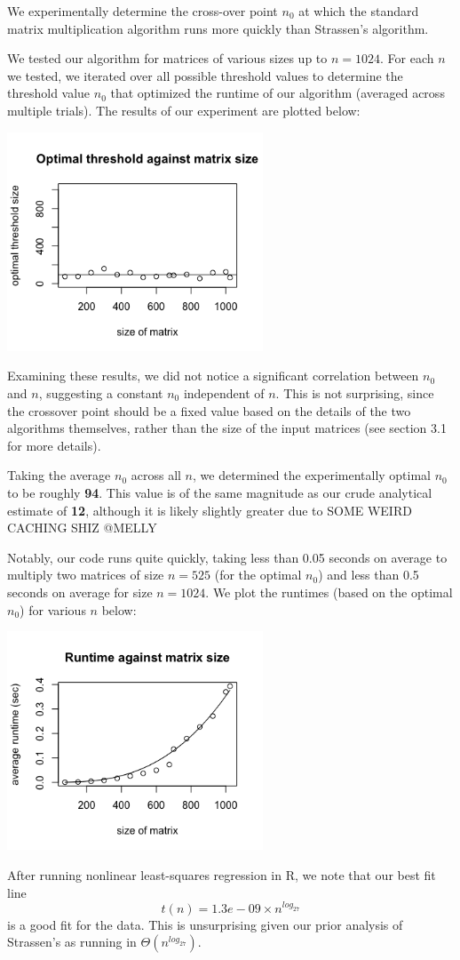 \documentclass[a4paper]{article}
\begin{document}
We experimentally determine the cross-over point $n_0$ at which the standard matrix multiplication algorithm runs more quickly than Strassen's algorithm.

We tested our algorithm for matrices of various sizes up to $n=1024$. For each $n$ we tested, we iterated over all possible threshold values to determine the threshold value $n_0$ that optimized the runtime of our algorithm (averaged across multiple trials). The results of our experiment are plotted below: \\

\begin{centering}
\includegraphics[width=3in]{threshplot} \\
\end{centering}

Examining these results, we did not notice a significant correlation between $n_0$ and $n$, suggesting a constant $n_0$ independent of $n$. This is not surprising, since the crossover point should be a fixed value based on the details of the two algorithms themselves, rather than the size of the input matrices (see section 3.1 for more details).

Taking the average $n_0$ across all $n$, we determined the experimentally optimal $n_0$ to be roughly \textbf{94}. This value is of the same magnitude as our crude analytical estimate of \textbf{12}, although it is likely slightly greater due to SOME WEIRD CACHING SHIZ @MELLY

Notably, our code runs quite quickly, taking less than 0.05 seconds on average to multiply two matrices of size $n = 525$ (for the optimal $n_0$) and less than 0.5 seconds on average for size $n = 1024$. We plot the runtimes (based on the optimal $n_0$) for various $n$ below: \\

\begin{centering}
\includegraphics[width=3in]{timeplot} \\
\end{centering}

After running nonlinear least-squares regression in R, we note that our best fit line $$t(n) = 1.3e-09 \times n^{log_27}$$
is a good fit for the data. This is unsurprising given our prior analysis of Strassen's as running in $\Theta(n^{log_27})$.
\end{document}
